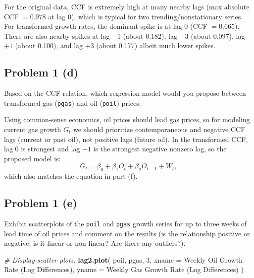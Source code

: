 \documentclass[
  10pt,
]{extarticle}
\newenvironment{Shaded}{\begin{snugshade}}{\end{snugshade}}
\newcommand{\AttributeTok}[1]{\textcolor[rgb]{0.13,0.29,0.53}{#1}}
\newcommand{\CommentTok}[1]{\textcolor[rgb]{0.56,0.35,0.01}{\textit{#1}}}
\newcommand{\DecValTok}[1]{\textcolor[rgb]{0.00,0.00,0.81}{#1}}
\newcommand{\FunctionTok}[1]{\textcolor[rgb]{0.13,0.29,0.53}{\textbf{#1}}}
\newcommand{\NormalTok}[1]{#1}
\newcommand{\StringTok}[1]{\textcolor[rgb]{0.31,0.60,0.02}{#1}}
\begin{document}
For the original data, CCF is extremely high at many nearby lags (max absolute CCF \(=0.978\) at lag 0), which is typical for two trending/nonstationary series. For transformed growth rates, the dominant spike is at lag 0 (CCF \(=0.665\)). There are also nearby spikes at lag \(-1\) (about 0.182), lag \(-3\) (about 0.097), lag \(+1\) (about 0.100), and lag \(+3\) (about 0.177) albeit much lower spikes.

\newpage

\subsection{Problem 1 (d)}\label{problem-1-d}

\begin{problem}[Problem 1 (d)]
Based on the CCF relation, which regression model would you propose between transformed gas (\texttt{pgas}) and oil (\texttt{poil}) prices.
\end{problem}

Using common-sense economics, oil prices should lead gas prices, so for modeling current gas growth \(G_t\) we should prioritize contemporaneous and negative CCF lags (current or past oil), not positive lags (future oil). In the transformed CCF, lag 0 is strongest and lag \(-1\) is the strongest negative nonzero lag, so the proposed model is:
\[
G_t = \beta_0 + \beta_1 O_t + \beta_2 O_{t-1} + W_t,
\]
which also matches the equation in part (f).

\newpage

\subsection{Problem 1 (e)}\label{problem-1-e}

\begin{problem}[Problem 1 (e)]
Exhibit scatterplots of the \texttt{poil} and \texttt{pgas} growth series for up to three weeks of lead time of oil prices and comment on the results (is the relationship positive or negative; is it linear or non-linear? Are there any outliers?).
\end{problem}

\begin{Shaded}
\begin{Highlighting}[]
\CommentTok{\# Display scatter plots.}
\FunctionTok{lag2.plot}\NormalTok{(}
\NormalTok{  poil, pgas, }\DecValTok{3}\NormalTok{,}
  \AttributeTok{xname =} \StringTok{\textquotesingle{}Weekly Oil Growth Rate (Log Differences)\textquotesingle{}}\NormalTok{,}
  \AttributeTok{yname =} \StringTok{\textquotesingle{}Weekly Gas Growth Rate (Log Differences)\textquotesingle{}}
\NormalTok{)}
\end{Highlighting}
\end{Shaded}
\end{document}
